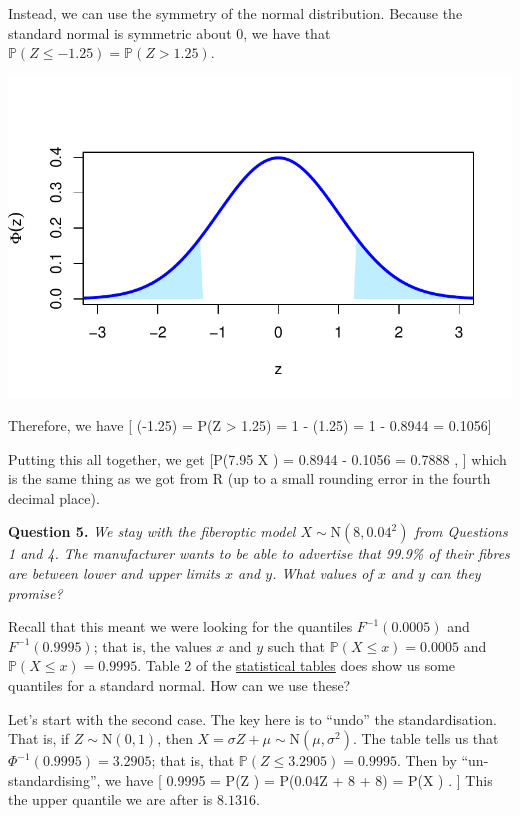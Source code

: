 \documentclass[
  letterpaper,
  DIV=11,
  numbers=noendperiod]{scrreprt}
\theoremstyle{remark}
\begin{document}
Instead, we can use the symmetry of the normal distribution. Because the
standard normal is symmetric about 0, we have that
\(\mathbb P(Z \leq -1.25) = \mathbb P(Z > 1.25)\).

\includegraphics{sections/L17-normal_files/figure-pdf/phiz-exm-1.pdf}

Therefore, we have {[} \Phi(-1.25) = \mathbb P(Z \textgreater{} 1.25) =
1 - \Phi(1.25) = 1 - 0.8944 = 0.1056{]}

Putting this all together, we get {[}\mathbb P(7.95 \leq X ) =
0.8944 - 0.1056 = 0.7888 , {]} which is the same thing as we got from R
(up to a small rounding error in the fourth decimal place).

\textbf{Question 5.} \emph{We stay with the fiberoptic model
\(X \sim \mathrm{N}(8, 0.04^2)\) from Questions 1 and 4. The
manufacturer wants to be able to advertise that 99.9\% of their fibres
are between lower and upper limits \(x\) and \(y\). What values of \(x\)
and \(y\) can they promise?}

Recall that this meant we were looking for the quantiles
\(F^{-1}(0.0005)\) and \(F^{-1}(0.9995)\); that is, the values \(x\) and
\(y\) such that \(\mathbb P(X \leq x) = 0.0005\) and
\(\mathbb P(X \leq x) = 0.9995\). Table 2 of the
\href{https://mpaldridge.github.io/math1710/stat-tab.pdf}{statistical
tables} does show us some quantiles for a standard normal. How can we
use these?

Let's start with the second case. The key here is to ``undo'' the
standardisation. That is, if \(Z \sim \mathrm{N}(0,1)\), then
\(X = \sigma Z + \mu \sim \mathrm{N}(\mu, \sigma^2)\). The table tells
us that \(\Phi^{-1}(0.9995) = 3.2905\); that is, that
\(\mathbb P(Z \leq 3.2905) = 0.9995\). Then by ``un-standardising'', we
have {[} 0.9995 = \mathbb P(Z ) = \mathbb P(0.04Z + 8
 + 8) = \mathbb P(X ) . {]} This the
upper quantile we are after is \(8.1316\).
\end{document}

